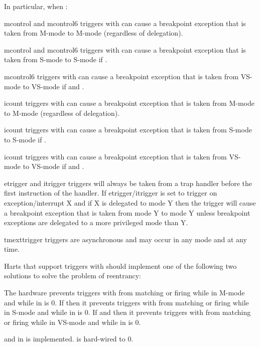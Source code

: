 \begin{commentary}
\begin{steps}{In particular, when :}
\item mcontrol and mcontrol6 triggers with  can cause a
breakpoint exception that is taken from M-mode to M-mode (regardless of
delegation).
\item mcontrol and mcontrol6 triggers with  can cause a
breakpoint exception that is taken from S-mode to S-mode if .
\item mcontrol6 triggers with  can cause a
breakpoint exception that is taken from VS-mode to VS-mode if 
and .
\item icount triggers with  can cause a
breakpoint exception that is taken from M-mode to M-mode (regardless of
delegation).
\item icount triggers with  can cause a
breakpoint exception that is taken from S-mode to S-mode if .
\item icount triggers with  can cause a
breakpoint exception that is taken from VS-mode to VS-mode if 
and .
\item etrigger and itrigger triggers will always be taken from a trap handler
before the first instruction of the handler.  If etrigger/itrigger is set to
trigger on exception/interrupt X and if X is delegated to mode Y then the
trigger will cause a breakpoint exception that is taken from mode Y to mode
Y unless breakpoint exceptions are delegated to a more privileged mode than Y.
\item tmexttrigger triggers are asynchronous and may occur in any mode and
at any time.
\end{steps}
\end{commentary}

\begin{steps}{Harts that support triggers with 
should implement one of the following two solutions to solve the problem of
reentrancy:}
\item The hardware prevents triggers with  from
matching or firing while in M-mode and while \FcsrMstatusMie in \Rmstatus is 0.  If
 then it prevents triggers with 
from matching or firing while in S-mode and while \FcsrSstatusSie in \Rsstatus is 0.
If  and  then it prevents triggers with
 from matching or firing while in VS-mode and while
\FcsrSstatusSie in \Rvsstatus is 0.
\item \FcsrTcontrolMte and \FcsrTcontrolMpte in \RcsrTcontrol is
implemented.  \Rmedeleg[3] is hard-wired to 0.
\end{steps}

